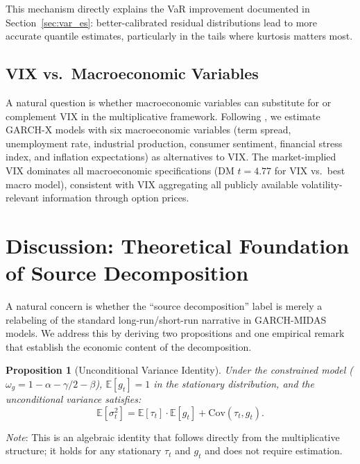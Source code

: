 \documentclass[12pt,a4paper]{article}
\newtheorem{proposition}{Proposition}
\newcommand{\E}{\mathbb{E}}
\begin{document}
This mechanism directly explains the VaR improvement documented in Section~\ref{sec:var_es}: better-calibrated residual distributions lead to more accurate quantile estimates, particularly in the tails where kurtosis matters most.

\subsection{VIX vs.\ Macroeconomic Variables}

A natural question is whether macroeconomic variables can substitute for or complement VIX in the multiplicative framework. Following \citet{conrad2015}, we estimate GARCH-X models with six macroeconomic variables (term spread, unemployment rate, industrial production, consumer sentiment, financial stress index, and inflation expectations) as alternatives to VIX. The market-implied VIX dominates all macroeconomic specifications (DM $t = 4.77$ for VIX vs.\ best macro model), consistent with VIX aggregating all publicly available volatility-relevant information through option prices.


\section{Discussion: Theoretical Foundation of Source Decomposition}
\label{sec:discussion}

A natural concern is whether the ``source decomposition'' label is merely a relabeling of the standard long-run/short-run narrative in GARCH-MIDAS models. We address this by deriving two propositions and one empirical remark that establish the economic content of the decomposition.

\begin{proposition}[Unconditional Variance Identity]
Under the constrained model ($\omega_g = 1 - \alpha - \gamma/2 - \beta$), $\E[g_t] = 1$ in the stationary distribution, and the unconditional variance satisfies:
\begin{equation}
\E[\sigma_t^2] = \E[\tau_t] \cdot \E[g_t] + \mathrm{Cov}(\tau_t, g_t).
\label{eq:var_identity}
\end{equation}
\end{proposition}

\noindent\textit{Note}: This is an algebraic identity that follows directly from the multiplicative structure; it holds for any stationary $\tau_t$ and $g_t$ and does not require estimation.
\end{document}
